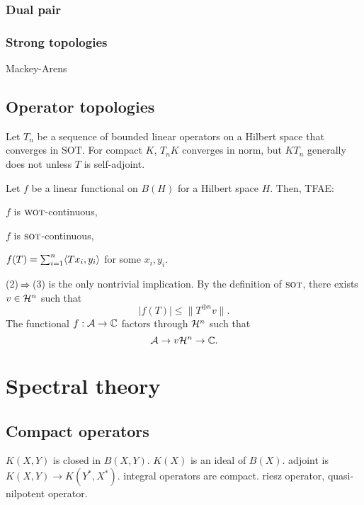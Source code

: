 \documentclass{../note}
\newcommand{\wot}{{\text{\sc wot}}}
\newcommand{\sot}{{\text{\sc sot}}}
\begin{document}
\section{Dual pair}
\section{Strong topologies}
Mackey-Arens


\chapter{Operator topologies}
\begin{prb}
Let $T_n$ be a sequence of bounded linear operators on a Hilbert space that converges in SOT.
For compact $K$, $T_n K$ converges in norm, but $KT_n$ generally does not unless $T$ is self-adjoint.
\end{prb}

\begin{prb}
Let $f$ be a linear functional on $B(H)$ for a Hilbert space $H$.
Then, TFAE:
\begin{parts}
\item $f$ is $\wot$-continuous,
\item $f$ is $\sot$-continuous,
\item $f(T)=\sum_{i=1}^n\langle Tx_i,y_i\rangle$ for some $x_i,y_i$.
\end{parts}
\end{prb}
\begin{pf}
(2)$\impl$(3) is the only nontrivial implication.
By the definition of $\sot$, there exists $v\in \mathcal{H}^n$ such that
\[|f(T)|\le\|T^{\oplus n}v\|.\]
The functional $f:\mathcal{A}\to\mathbb{C}$ factors through $\mathcal{H}^n$ such that
\[\mathcal{A}\to{v}\mathcal{H}^n\to\mathbb{C}.\]
\end{pf}












\part{Spectral theory}


\chapter{Compact operators}

$K(X,Y)$ is closed in $B(X,Y)$.
$K(X)$ is an ideal of $B(X)$.
adjoint is $K(X,Y)\to K(Y^*,X^*)$.
integral operators are compact.
riesz operator, quasi-nilpotent operator.
\end{document}
